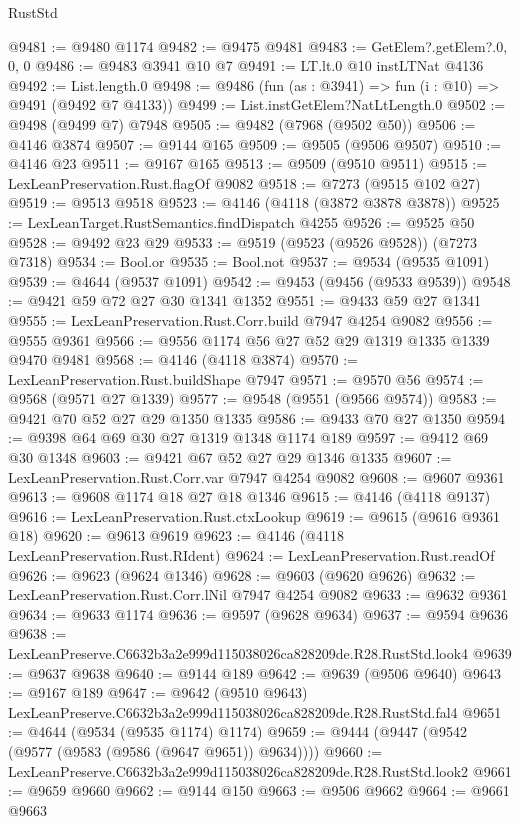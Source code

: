 \begin{lexlean}{RustStd}
\begin{coremodule}
@9481 := @9480 @1174
@9482 := @9475 @9481
@9483 := GetElem?.getElem?.{0, 0, 0}
@9486 := @9483 @3941 @10 @7
@9491 := LT.lt.{0} @10 instLTNat @4136
@9492 := List.length.{0}
@9498 := @9486 (fun (as : @3941) => fun (i : @10) => @9491 (@9492 @7 @4133))
@9499 := List.instGetElem?NatLtLength.{0}
@9502 := @9498 (@9499 @7) @7948
@9505 := @9482 (@7968 (@9502 @50))
@9506 := @4146 @3874
@9507 := @9144 @165
@9509 := @9505 (@9506 @9507)
@9510 := @4146 @23
@9511 := @9167 @165
@9513 := @9509 (@9510 @9511)
@9515 := LexLeanPreservation.Rust.flagOf @9082
@9518 := @7273 (@9515 @102 @27)
@9519 := @9513 @9518
@9523 := @4146 (@4118 (@3872 @3878 @3878))
@9525 := LexLeanTarget.RustSemantics.findDispatch @4255
@9526 := @9525 @50
@9528 := @9492 @23 @29
@9533 := @9519 (@9523 (@9526 @9528)) (@7273 @7318)
@9534 := Bool.or
@9535 := Bool.not
@9537 := @9534 (@9535 @1091)
@9539 := @4644 (@9537 @1091)
@9542 := @9453 (@9456 (@9533 @9539))
@9548 := @9421 @59 @72 @27 @30 @1341 @1352
@9551 := @9433 @59 @27 @1341
@9555 := LexLeanPreservation.Rust.Corr.build @7947 @4254 @9082
@9556 := @9555 @9361
@9566 := @9556 @1174 @56 @27 @52 @29 @1319 @1335 @1339 @9470 @9481
@9568 := @4146 (@4118 @3874)
@9570 := LexLeanPreservation.Rust.buildShape @7947
@9571 := @9570 @56
@9574 := @9568 (@9571 @27 @1339)
@9577 := @9548 (@9551 (@9566 @9574))
@9583 := @9421 @70 @52 @27 @29 @1350 @1335
@9586 := @9433 @70 @27 @1350
@9594 := @9398 @64 @69 @30 @27 @1319 @1348 @1174 @189
@9597 := @9412 @69 @30 @1348
@9603 := @9421 @67 @52 @27 @29 @1346 @1335
@9607 := LexLeanPreservation.Rust.Corr.var @7947 @4254 @9082
@9608 := @9607 @9361
@9613 := @9608 @1174 @18 @27 @18 @1346
@9615 := @4146 (@4118 @9137)
@9616 := LexLeanPreservation.Rust.ctxLookup
@9619 := @9615 (@9616 @9361 @18)
@9620 := @9613 @9619
@9623 := @4146 (@4118 LexLeanPreservation.Rust.RIdent)
@9624 := LexLeanPreservation.Rust.readOf
@9626 := @9623 (@9624 @1346)
@9628 := @9603 (@9620 @9626)
@9632 := LexLeanPreservation.Rust.Corr.lNil @7947 @4254 @9082
@9633 := @9632 @9361
@9634 := @9633 @1174
@9636 := @9597 (@9628 @9634)
@9637 := @9594 @9636
@9638 := LexLeanPreserve.C6632b3a2e999d115038026ca828209de.R28.RustStd.look4
@9639 := @9637 @9638
@9640 := @9144 @189
@9642 := @9639 (@9506 @9640)
@9643 := @9167 @189
@9647 := @9642 (@9510 @9643) LexLeanPreserve.C6632b3a2e999d115038026ca828209de.R28.RustStd.fal4
@9651 := @4644 (@9534 (@9535 @1174) @1174)
@9659 := @9444 (@9447 (@9542 (@9577 (@9583 (@9586 (@9647 @9651)) @9634))))
@9660 := LexLeanPreserve.C6632b3a2e999d115038026ca828209de.R28.RustStd.look2
@9661 := @9659 @9660
@9662 := @9144 @150
@9663 := @9506 @9662
@9664 := @9661 @9663

\end{coremodule}
\end{lexlean}
